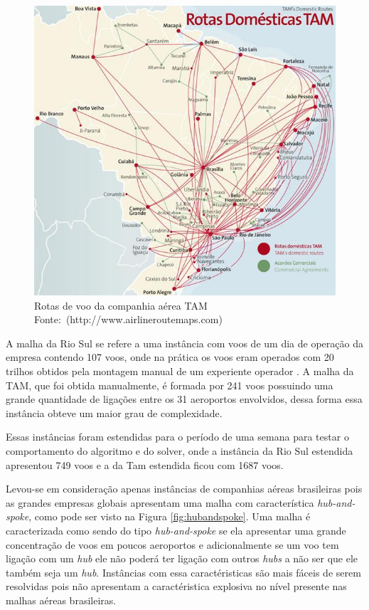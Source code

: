 \begin{figure}[h]
\centering
\caption{Rotas de voo da companhia aérea TAM \newline \mbox{Fonte:
(http://www.airlineroutemaps.com) }}

\label{fig:malhatam}
\includegraphics[scale=0.45]{./img/tam_brazilian_airlines}
\end{figure}
	
A malha da Rio Sul se refere a uma instância com voos de um dia de operação da
empresa contendo 107 voos, onde na prática os voos eram operados com 20 trilhos
obtidos pela montagem manual de um experiente operador \cite{pontes2002}. A
malha da TAM, que foi obtida manualmente, é formada por 241 voos possuindo
uma grande quantidade de ligações entre os 31 aeroportos envolvidos, dessa
forma essa instância  obteve um maior grau de complexidade.

Essas instâncias foram estendidas para o período de uma semana para testar o
comportamento do algoritmo e do solver, onde a instância da Rio Sul
estendida apresentou 749 voos e a da Tam estendida ficou com 1687 voos.
	
Levou-se em consideração apenas instâncias de companhias aéreas brasileiras pois
as grandes empresas globais apresentam uma malha com característica
\textit{hub-and-spoke}, como pode ser visto na Figura \ref{fig:hubandspoke}. Uma
malha é caracterizada como sendo do tipo \textit{hub-and-spoke} se ela
apresentar uma grande concentração de voos em poucos aeroportos e
adicionalmente se um voo tem ligação com um \textit{hub} ele não poderá ter
ligação com outros \textit{hubs} a não ser que ele também seja um \textit{hub}.
Instâncias com essa caractéristicas são mais fáceis de serem resolvidas pois
não apresentam a caractéristica explosiva no nível presente nas malhas aéreas brasileiras.
	
